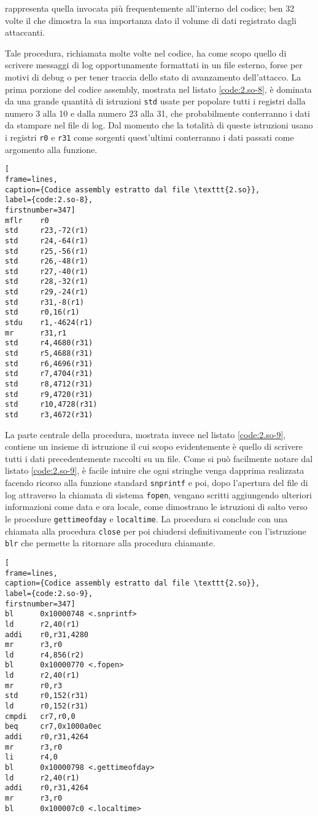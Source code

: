 \documentclass[10pt,a4paper, titlepage]{report}
\begin{document}
 rappresenta quella invocata più frequentemente all'interno del codice; ben 32 volte il che dimostra la sua importanza dato il volume di dati registrato dagli attaccanti.

Tale procedura, richiamata molte volte nel codice, ha come scopo quello di scrivere messaggi di log opportunamente formattati in un file esterno, forse per motivi di debug o per tener traccia dello stato di avanzamento dell'attacco.
La prima porzione del codice assembly, mostrata nel listato \ref{code:2.so-8}, è dominata da una grande quantità di istruzioni \texttt{std} usate per popolare tutti i registri dalla numero 3 alla 10 e dalla numero 23 alla 31, che probabilmente conterranno i dati da stampare nel file di log.
Dal momento che la totalità di queste istruzioni usano i registri \texttt{r0} e \texttt{r31} come sorgenti quest'ultimi conterranno i dati passati come argomento alla funzione.

\begin{lstlisting}[
frame=lines, 
caption={Codice assembly estratto dal file \texttt{2.so}}, 
label={code:2.so-8},
firstnumber=347]
mflr    r0
std     r23,-72(r1)
std     r24,-64(r1)
std     r25,-56(r1)
std     r26,-48(r1)
std     r27,-40(r1)
std     r28,-32(r1)
std     r29,-24(r1)
std     r31,-8(r1)
std     r0,16(r1)
stdu    r1,-4624(r1)
mr      r31,r1
std     r4,4680(r31)
std     r5,4688(r31)
std     r6,4696(r31)
std     r7,4704(r31)
std     r8,4712(r31)
std     r9,4720(r31)
std     r10,4728(r31)
std     r3,4672(r31)
\end{lstlisting}

La parte centrale della procedura, mostrata invece nel listato \ref{code:2.so-9}, contiene un insieme di istruzione il cui scopo evidentemente è quello di scrivere tutti i dati precedentemente raccolti su un file.
Come si può facilmente notare dal listato  \ref{code:2.so-9}, è facile intuire che ogni stringhe venga dapprima realizzata facendo ricorso alla funzione standard \texttt{snprintf} e poi, dopo l'apertura del file di log attraverso la chiamata di sistema \texttt{fopen}, vengano scritti aggiungendo ulteriori informazioni come data e ora locale, come dimostrano le istruzioni di salto verso le procedure \texttt{gettimeofday} e \texttt{localtime}. 
La procedura si conclude con una chiamata alla procedura \texttt{close} per poi chiudersi definitivamente con l'istruzione \texttt{blr} che permette la ritornare alla procedura chiamante.

\begin{lstlisting}[
frame=lines, 
caption={Codice assembly estratto dal file \texttt{2.so}}, 
label={code:2.so-9},
firstnumber=347]
bl      0x10000748 <.snprintf>
ld      r2,40(r1)
addi    r0,r31,4280
mr      r3,r0
ld      r4,856(r2)
bl      0x10000770 <.fopen>
ld      r2,40(r1)
mr      r0,r3
std     r0,152(r31)
ld      r0,152(r31)
cmpdi   cr7,r0,0
beq     cr7,0x1000a0ec
addi    r0,r31,4264
mr      r3,r0
li      r4,0
bl      0x10000798 <.gettimeofday>
ld      r2,40(r1)
addi    r0,r31,4264
mr      r3,r0
bl      0x100007c0 <.localtime>
\end{lstlisting}
\end{document}
